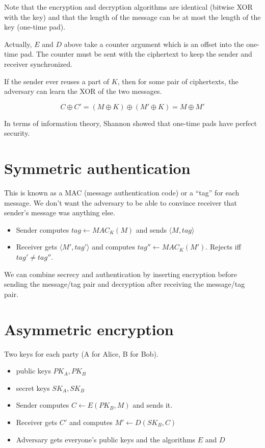 \documentclass[12pt]{article}
\begin{document}
Note that the encryption and decryption algorithms are identical 
(bitwise XOR with the key) and that the length of the message can be at most
the length of the key (one-time pad).

Actually, $E$ and $D$ above take a counter argument which is an offset into
the one-time pad. The counter must be sent with the ciphertext to keep the
sender and receiver synchronized.

If the sender ever reuses a part of $K$, then for some pair of ciphertexts,
the adversary can learn the XOR of the two messages.

\begin{displaymath}
C \oplus C' = (M \oplus K) \oplus (M' \oplus K) = M \oplus M'
\end{displaymath}

In terms of information theory, Shannon showed that one-time pads have
perfect security.

\section{Symmetric authentication}

This is known as a MAC (message authentication code) or a ``tag'' for each
message. We don't want the adversary to be able to convince receiver that
sender's message was anything else.

\begin{itemize}
\item
Sender computes $tag \gets MAC_K(M)$ and sends $\langle M, tag \rangle$
\item
Receiver gets $\langle M', tag' \rangle$ and computes $tag'' \gets MAC_K(M')$.
Rejects iff $tag' \ne tag''$.
\end{itemize}

We can combine secrecy and authentication by inserting encryption before
sending the message/tag pair and decryption after receiving the message/tag pair.

\section{Asymmetric encryption}

Two keys for each party (A for Alice, B for Bob).

\begin{itemize}
\item public keys $PK_A, PK_B$
\item secret keys $SK_A, SK_B$
\item Sender computes $C \gets E(PK_B, M)$ and sends it.
\item Receiver gets $C'$ and computes $M' \gets D(SK_B, C)$
\item Adversary gets everyone's public keys and the algorithms $E$ and $D$
\end{itemize}
\end{document}
